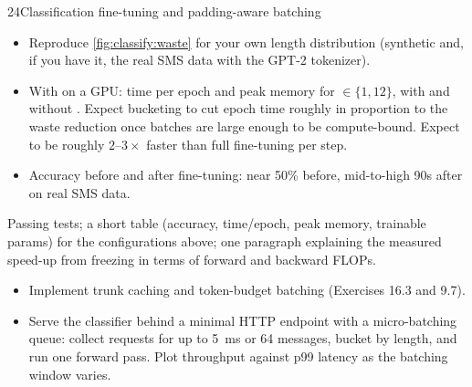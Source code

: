 \begin{labbox}{24}{Classification fine-tuning and padding-aware batching}
\begin{itemize}
\item Reproduce \cref{fig:classify:waste} for your own length distribution (synthetic
and, if you have it, the real SMS data with the GPT-2 tokenizer).
\item With  on a GPU: time per epoch and peak memory for
$\in\{1,12\}$, with and without . Expect
bucketing to cut epoch time roughly in proportion to the waste reduction once batches
are large enough to be compute-bound. Expect  to be
roughly $2$--$3\times$ faster than full fine-tuning per step.
\item Accuracy before and after fine-tuning: near 50\% before, mid-to-high 90s after on
real SMS data.
\end{itemize}

Passing tests; a short table (accuracy, time/epoch, peak memory, trainable params) for
the configurations above; one paragraph explaining the measured speed-up from freezing
in terms of forward and backward FLOPs.

\begin{itemize}
\item Implement trunk caching and token-budget batching (Exercises 16.3 and 9.7).
\item Serve the classifier behind a minimal HTTP endpoint with a micro-batching queue:
collect requests for up to \SI{5}{ms} or 64 messages, bucket by length, and run one
forward pass. Plot throughput against p99 latency as the batching window varies.
\end{itemize}
\end{labbox}
